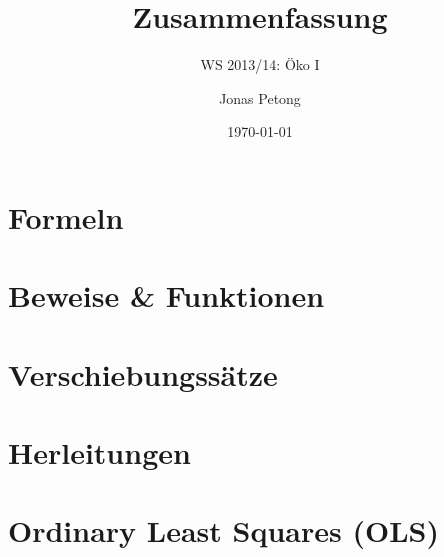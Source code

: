 \documentclass[
	14pt,							%
	a4paper,						%
	landscape,						%
	titlepage,
	oneside,						%
	openany,						%
	onecolumn,						%
	fleqn,							%
%
	 headings=normal,				%
	 headsepline=true,				%
	 footsepline=false,				%
	 headinclude=false,				%
	 footinclude=false,				%
	 twocolumn=false,				%
	 cleardoublepage=plain,			%
	 bibliography=totoc,
	 listof=totoc,
	 toc=index,						%
	 parskip=off,					%
	 pagesize=pdftex				%
%
]{scrartcl}
\title{Zusammenfassung}
\subtitle{WS 2013/14: Öko I}
\author{Jonas Petong}
\date{\today}
\begin{document}
\maketitle

\section{Formeln}
\label{sec:formeln}


\pagebreak
\section{Beweise \& Funktionen}
\label{sec:derivations}


\pagebreak
\section{Verschiebungssätze}
\label{sec:verschiebungssatze}


\pagebreak
\section{Herleitungen}
\label{sec:verschiebungssatze}


\pagebreak
\section{Ordinary Least Squares (OLS)}
\label{sec:ordinary_least_squares_ols}

\end{document}
